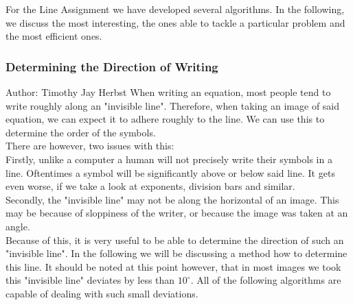 \documentclass[12pt]{article}
\begin{document}
	For the Line Assignment we have developed several algorithms. In the following, we discuss the most interesting, the ones able to tackle a particular problem and the most efficient ones.
	
	\subsubsection{Determining the Direction of Writing}
	\small{Author: Timothy Jay Herbst} \newline \newline
	When writing an equation, most people tend to write roughly along an "invisible line".
	Therefore, when taking an image of said equation, we can expect it to adhere roughly to the line.
	We can use this to determine the order of the symbols.\\
	There are however, two issues with this:\\
	Firstly, unlike a computer a human will not precisely write their symbols in a line.
	Oftentimes a symbol will be significantly above or below said line.
	It gets even worse, if we take a look at exponents, division bars and similar.\\
	Secondly, the "invisible line" may not be along the horizontal of an image.
	This may be because of sloppiness of the writer, or because the image was taken at an angle.\\
	Because of this, it is very useful to be able to determine the direction of such an "invisible line".
	In the following we will be discussing a method how to determine this line.
	It should be noted at this point however, that in most images we took this "invisible line" deviates by less than $10^\circ$.
	All of the following algorithms are capable of dealing with such small deviations.\\
	
	
	
	
	
\end{document}
